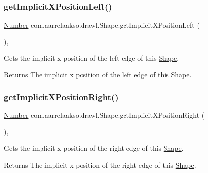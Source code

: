\subsubsection{\texorpdfstring{get\+Implicit\+X\+Position\+Left()}{getImplicitXPositionLeft()}}
{\footnotesize\ttfamily \hyperlink{interfacecom_1_1aarrelaakso_1_1drawl_1_1_number}{Number} com.\+aarrelaakso.\+drawl.\+Shape.\+get\+Implicit\+X\+Position\+Left (\begin{DoxyParamCaption}{ }\end{DoxyParamCaption})\hspace{0.3cm}{\ttfamily [protected]}, {\ttfamily [inherited]}}



Gets the implicit x position of the left edge of this \hyperlink{classcom_1_1aarrelaakso_1_1drawl_1_1_shape}{Shape}. 

\begin{DoxyReturn}{Returns}
The implicit x position of the left edge of this \hyperlink{classcom_1_1aarrelaakso_1_1drawl_1_1_shape}{Shape}. 
\end{DoxyReturn}
\mbox{\label{classcom_1_1aarrelaakso_1_1drawl_1_1_shape_a15599ef4ee30a0ddd372f7cf1b155ce1}} 
\subsubsection{\texorpdfstring{get\+Implicit\+X\+Position\+Right()}{getImplicitXPositionRight()}}
{\footnotesize\ttfamily \hyperlink{interfacecom_1_1aarrelaakso_1_1drawl_1_1_number}{Number} com.\+aarrelaakso.\+drawl.\+Shape.\+get\+Implicit\+X\+Position\+Right (\begin{DoxyParamCaption}{ }\end{DoxyParamCaption})\hspace{0.3cm}{\ttfamily [protected]}, {\ttfamily [inherited]}}



Gets the implicit x position of the right edge of this \hyperlink{classcom_1_1aarrelaakso_1_1drawl_1_1_shape}{Shape}. 

\begin{DoxyReturn}{Returns}
The implicit x position of the right edge of this \hyperlink{classcom_1_1aarrelaakso_1_1drawl_1_1_shape}{Shape}. 
\end{DoxyReturn}
\mbox{\label{classcom_1_1aarrelaakso_1_1drawl_1_1_shape_a8d44b02976656bf4a81055a2dbae66cb}} 
